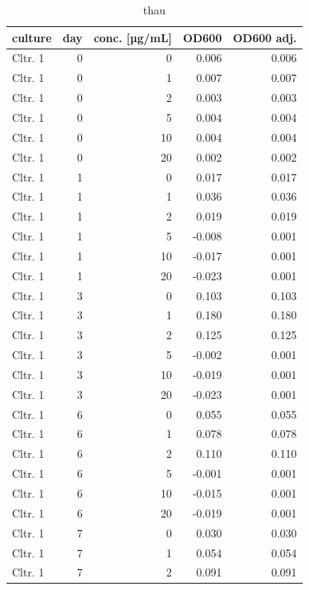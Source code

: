 \begin{longtable}{lrrrr}
\caption{thau} \\ 
  \toprule
culture & day & conc. [µg/mL] & OD600 & OD600 adj. \\ 
  \midrule
Cltr. 1 &    0 &    0 & 0.006 & 0.006 \\ 
  Cltr. 1 &    0 &    1 & 0.007 & 0.007 \\ 
  Cltr. 1 &    0 &    2 & 0.003 & 0.003 \\ 
  Cltr. 1 &    0 &    5 & 0.004 & 0.004 \\ 
  Cltr. 1 &    0 &   10 & 0.004 & 0.004 \\ 
  Cltr. 1 &    0 &   20 & 0.002 & 0.002 \\ 
  Cltr. 1 &    1 &    0 & 0.017 & 0.017 \\ 
  Cltr. 1 &    1 &    1 & 0.036 & 0.036 \\ 
  Cltr. 1 &    1 &    2 & 0.019 & 0.019 \\ 
  Cltr. 1 &    1 &    5 & -0.008 & 0.001 \\ 
  Cltr. 1 &    1 &   10 & -0.017 & 0.001 \\ 
  Cltr. 1 &    1 &   20 & -0.023 & 0.001 \\ 
  Cltr. 1 &    3 &    0 & 0.103 & 0.103 \\ 
  Cltr. 1 &    3 &    1 & 0.180 & 0.180 \\ 
  Cltr. 1 &    3 &    2 & 0.125 & 0.125 \\ 
  Cltr. 1 &    3 &    5 & -0.002 & 0.001 \\ 
  Cltr. 1 &    3 &   10 & -0.019 & 0.001 \\ 
  Cltr. 1 &    3 &   20 & -0.023 & 0.001 \\ 
  Cltr. 1 &    6 &    0 & 0.055 & 0.055 \\ 
  Cltr. 1 &    6 &    1 & 0.078 & 0.078 \\ 
  Cltr. 1 &    6 &    2 & 0.110 & 0.110 \\ 
  Cltr. 1 &    6 &    5 & -0.001 & 0.001 \\ 
  Cltr. 1 &    6 &   10 & -0.015 & 0.001 \\ 
  Cltr. 1 &    6 &   20 & -0.019 & 0.001 \\ 
  Cltr. 1 &    7 &    0 & 0.030 & 0.030 \\ 
  Cltr. 1 &    7 &    1 & 0.054 & 0.054 \\ 
  Cltr. 1 &    7 &    2 & 0.091 & 0.091 \\ 

\end{longtable}

